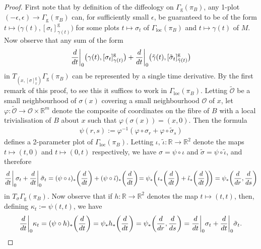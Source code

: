\documentclass[11pt]{article}
\numberwithin{equation}{section}
\numberwithin{equation}{section}
\def\loc{\operatorname{loc}}
\def\g{\operatorname{g}}
\def\OO{{\mathcal{O}}}
\def\RB{{\mathbb{R}}}
\begin{document}
\begin{proof}
First note that by definition of the diffeology on $\Gamma_{\g}(\pi_{B})$, any 1-plot $(-\epsilon,\epsilon)\rightarrow\Gamma_{\g}(\pi_{B})$ can, for sufficiently small $\epsilon$, be guaranteed to be of the form $t\mapsto \big(\gamma(t),[\sigma_{t}]^{\g}_{\gamma(t)}\big)$ for some plots $t\mapsto\sigma_{t}$ of $\Gamma_{\loc}(\pi_{B})$ and $t\mapsto\gamma(t)$ of $M$. Now observe that any sum of the form
\begin{gather*}
\frac{\rm d}{{\rm d}t}\bigg|_{0}\big(\gamma(t),[\sigma_{t}]^{\g}_{\gamma(t)}\big) +\frac{\rm d}{{\rm d}t}\bigg|_{0}\big(\tilde{\gamma}(t),[\tilde{\sigma}_{t}]^{\g}_{\tilde{\gamma}(t)}\big)
\end{gather*}
in $T_{\left(x,[\sigma]^{\g}_{x}\right)}\Gamma_{\g}(\pi_{B})$ can be represented by a single time derivative. By the first remark of this proof, to see this it suffices to work in $\Gamma_{\loc}(\pi_{B})$. Letting $\tilde{\OO}$ be a small neighbourhood of $\sigma(x)$ covering a small neighbourhood $\OO$ of $x$, let $\varphi\colon \tilde{\OO}\rightarrow\OO\times\RB^{m}$ denote the composite of coordinates on the fibre of $B$ with a local trivialisation of $B$ about $x$ such that $\varphi(\sigma(x)) = (x,0)$. Then the formula
\begin{gather*}%
\psi(r,s):=\varphi^{-1}(\varphi\circ\sigma_{r}+\varphi\circ\tilde{\sigma}_{s})
\end{gather*}
defines a 2-parameter plot of $\Gamma_{\loc}(\pi_{B})$. Letting $\iota,\,\tilde{\iota}\colon \RB\rightarrow\RB^{2}$ denote the maps $t\mapsto(t,0)$ and $t\mapsto(0,t)$ respectively, we have $\sigma = \psi\circ\iota$ and $\tilde{\sigma} =\psi\circ\tilde{\iota}$, and therefore
\begin{gather*}
\frac{\rm d}{{\rm d}t}\bigg|_{0}\!\sigma_{t}+\frac{\rm d}{{\rm d}t}\bigg|_{0}\!\tilde{\sigma}_{t} =(\psi\circ\iota)_{*}\bigg(\frac{\rm d}{{\rm d}t}\bigg)+(\psi\circ\tilde{\iota})_{*}\bigg(\frac{\rm d}{{\rm d}t}\bigg)\! = \psi_{*}\bigg(\iota_{*}\bigg(\frac{\rm d}{{\rm d}t}\bigg)+\tilde{\iota}_{*}\bigg(\frac{\rm d}{{\rm d}t}\bigg)\!\bigg) = \psi_{*}\bigg(\frac{\rm d}{{\rm d}r},\frac{\rm d}{{\rm d}s}\bigg)
\end{gather*}
in $T_{\sigma}\Gamma_{\g}(\pi_{B})$. Now observe that if $h\colon \RB\rightarrow\RB^{2}$ denotes the map $t\mapsto(t,t)$, then, defining $\kappa_{t}:=\psi(t,t)$, we have
\begin{gather*}
\frac{\rm d}{{\rm d}t}\bigg|_{0}\kappa_{t} = (\psi\circ h)_{*}\bigg(\frac{\rm d}{{\rm d}t}\bigg) = \psi_{*}h_{*}\bigg(\frac{\rm d}{{\rm d}t}\bigg) = \psi_{*}\bigg(\frac{\rm d}{{\rm d}r},\frac{\rm d}{{\rm d}s}\bigg) = \frac{\rm d}{{\rm d}t}\bigg|_{0}\sigma_{t}+\frac{\rm d}{{\rm d}t}\bigg|_{0}\tilde{\sigma}_{t}.

\end{gather*}
\end{proof}
\end{document}
